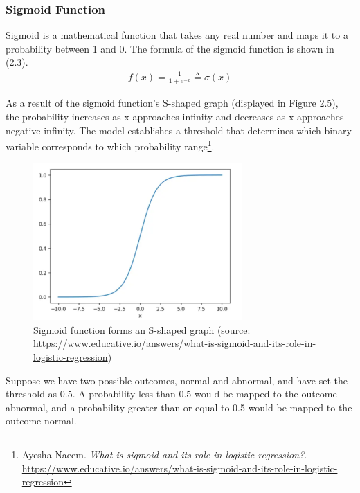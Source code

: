 \subsubsection{Sigmoid Function}
\hspace{0.5cm}Sigmoid is a mathematical function that takes any real number and maps it to a probability between 1 and 0.
The formula of the sigmoid function is shown in (2.3).
\begin{align}
    f(x) = \frac{1}{1 + e^{-x}} \triangleq \sigma(x)
\end{align}

As a result of the sigmoid function's S-shaped graph (displayed in Figure 2.5), the probability increases as x approaches infinity and decreases as x approaches negative infinity. The model establishes a threshold that determines which binary variable corresponds to which probability range\footnote{
	Ayesha Naeem. \textit{What is sigmoid and its role in logistic regression?}. \url{https://www.educative.io/answers/what-is-sigmoid-and-its-role-in-logistic-regression}
}.

\begin{figure}[h!]
	\centering
	\includegraphics[width=\linewidth, height=6cm,keepaspectratio]{figures/sigmoid.PNG}
	\caption{Sigmoid function forms an S-shaped graph (source: \url{https://www.educative.io/answers/what-is-sigmoid-and-its-role-in-logistic-regression})}
\end{figure}

Suppose we have two possible outcomes, normal and abnormal, and have set the threshold as 0.5. A probability less than 0.5 would be mapped to the outcome abnormal, and a probability greater than or equal to 0.5 would be mapped to the outcome normal.

